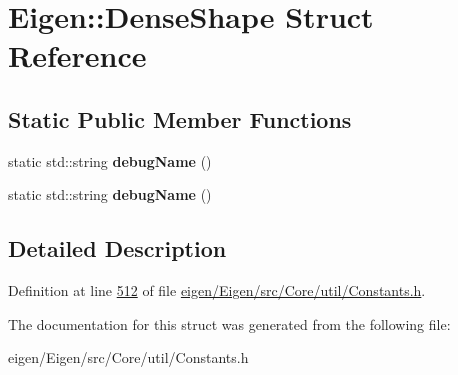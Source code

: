 \hypertarget{struct_eigen_1_1_dense_shape}{}\section{Eigen\+:\+:Dense\+Shape Struct Reference}
\label{struct_eigen_1_1_dense_shape}
\subsection*{Static Public Member Functions}
\begin{DoxyCompactItemize}
\item 
\mbox{\label{struct_eigen_1_1_dense_shape_ad56c4d75fae06c49cf2bd45f5814b8ed}} 
static std\+::string {\bfseries debug\+Name} ()
\item 
\mbox{\label{struct_eigen_1_1_dense_shape_ad56c4d75fae06c49cf2bd45f5814b8ed}} 
static std\+::string {\bfseries debug\+Name} ()
\end{DoxyCompactItemize}


\subsection{Detailed Description}


Definition at line \hyperlink{eigen_2_eigen_2src_2_core_2util_2_constants_8h_source_l00512}{512} of file \hyperlink{eigen_2_eigen_2src_2_core_2util_2_constants_8h_source}{eigen/\+Eigen/src/\+Core/util/\+Constants.\+h}.



The documentation for this struct was generated from the following file\+:\begin{DoxyCompactItemize}
\item 
eigen/\+Eigen/src/\+Core/util/\+Constants.\+h\end{DoxyCompactItemize}
